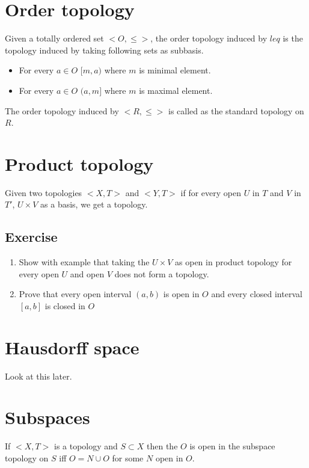 \documentclass[twosides, openany]{tufte-book}
\begin{document}
\chapter{Order topology}
Given a totally ordered set $<O, \leq>$, the order topology induced by $leq$ is the topology induced by taking following sets as subbasis.
\begin{itemize}
    \item For every $a \in O$ $[m, a)$ where $m$ is minimal element.
    \item For every $a \in O$ $(a, m]$ where $m$ is maximal element.
\end{itemize} 

The order topology induced by $<R, \leq>$ is called as the standard topology on $R$.

\chapter{Product topology}

Given two topologies $<X, T>$ and $<Y, T>$ if for every open $U$ in $T$ and $V$ in $T'$,  $U \times V$ as a basis, we get a topology.


\section{Exercise}
\begin{enumerate}
    \item Show with example that taking the $U \times V$ as open in product topology for every open $U$ and open $V$ does not form a topology.    
    \item Prove that every open interval $(a,b)$ is open in $O$ and every closed interval $[a,b]$ is closed in $O$ 
\end{enumerate}

\chapter{Hausdorff space}
Look at this later.

\chapter{Subspaces}
If $<X, T>$ is a topology and $S \subset X$ then the $O$ is open in the subspace topology on $S$ iff $O = N \cup O$ for some $N$ open in $O$.
\end{document}

